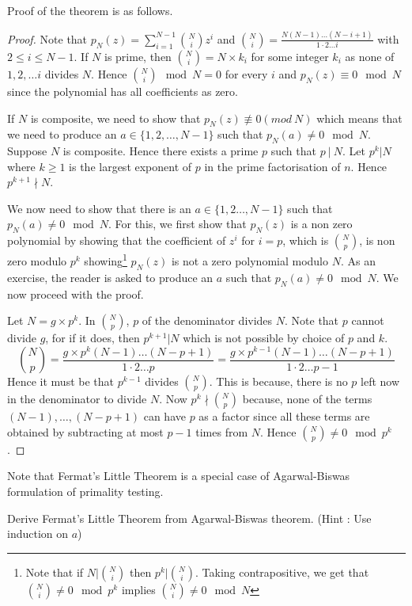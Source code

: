 Proof of the theorem is as follows.
\begin{proof}
	Note that $p_N(z) = \sum_{i=1}^{N-1} \binom{N}{i} z^i$ and
	$\binom{N}{i} = \frac{N(N-1)\ldots (N-i+1)}{1\cdot 2 \ldots i}$ with $2
	\le i \le N-1$. 
	If $N$ is prime, then $\binom{N}{i} = N \times k_i$ for some integer
	$k_i$ as none of $1, 2, \ldots i$ divides $N$. Hence $\binom{N}{i}
	\mod N = 0$ for every $i$ and $p_N(z) \equiv 0 \mod N$ since the
	polynomial has all coefficients as zero.

	If $N$ is composite, we need to show that $p_N(z) \not 
	\equiv 0 (mod~ N)$ which means that we need to produce an $a \in
	\{1,2,\ldots, N-1\}$ such that $p_N(a) \ne 0 \mod N$. Suppose $N$ is
	composite. Hence there exists a prime $p$ such that $p ~|~
	N$.  Let $p^k | N$ where $k \ge 1$ is the largest exponent of $p$ in
	the prime factorisation of $n$. Hence $p^{k+1} \nmid N$.
	
	We now need to show that there is an $a \in \{1,2\ldots, N-1\}$ such
	that $p_N(a) \ne 0 \mod N$. For this, we first show that $p_N(z)$ is a 
	non zero polynomial by showing that the coefficient of $z^i$ for $i =
	p$, which is $\binom{N}{p}$, is non zero modulo $p^k$
	showing\footnote{Note that if
		$N|\binom{N}{i}$ then $p^k | \binom{N}{i}$. Taking
		contrapositive, we get that $\binom{N}{i} \not = 0 \mod p^k$
		implies $\binom{N}{i} \not = 0 \mod N$} $p_N(z)$ is not a zero
		polynomial modulo $N$. As an exercise, the reader is asked to produce an
		$a$ such that $p_N(a) \ne 0 \mod N$. We now proceed with the
		proof.

	Let $N = g \times p^k$. In $\binom{N}{p}$, $p$ of the denominator 
	divides $N$. Note that $p$ cannot divide $g$, for if it does, then
	$p^{k+1} | N$ which is not possible by choice of $p$ and $k$.
		\begin{equation}
		\binom{N}{p} = \frac{g\times p^k(N-1)\ldots (N-p+1)}
		{1\cdot 2 \ldots p} = \frac{g\times p^{k-1}(N-1)\ldots 
			\label{eq:ag-bis-proof}
		(N-p+1)}{1\cdot 2 \ldots p-1} \end{equation}
	Hence it must be that $p^{k-1}$ divides $\binom{N}{p}$. This is
	because, there is no $p$ left now in the denominator to divide $N$.
	Now $p^k \nmid \binom{N}{p}$ because, none of the terms $(N-1),
	\ldots,
	(N-p+1)$ can have $p$ as a factor since all these terms are obtained by
	subtracting at most $p-1$ times from $N$. Hence $\binom{N}{p} \ne 0
	\mod p^k$.
\end{proof}

Note that Fermat's Little Theorem is a special case of Agarwal-Biswas
formulation of primality testing.
\begin{exercise}
Derive Fermat's Little Theorem from Agarwal-Biswas theorem. (Hint : Use
induction on $a$)
\end{exercise}

